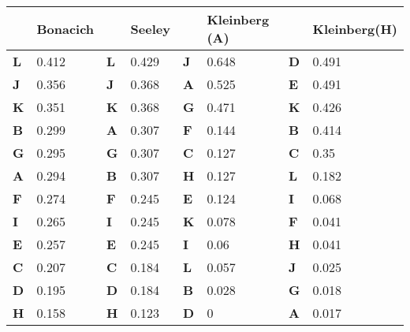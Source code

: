 \begin{table}[!h]
\centering
\begin{tabular}[t]{>{}ll>{}ll>{}ll>{}ll}
\toprule
 & Bonacich &  & Seeley &  & Kleinberg (A) &  & Kleinberg(H)\\
\midrule
\textbf{L} & 0.412 & \textbf{L} & 0.429 & \textbf{J} & 0.648 & \textbf{D} & 0.491\\
\textbf{J} & 0.356 & \textbf{J} & 0.368 & \textbf{A} & 0.525 & \textbf{E} & 0.491\\
\textbf{K} & 0.351 & \textbf{K} & 0.368 & \textbf{G} & 0.471 & \textbf{K} & 0.426\\
\textbf{B} & 0.299 & \textbf{A} & 0.307 & \textbf{F} & 0.144 & \textbf{B} & 0.414\\
\textbf{G} & 0.295 & \textbf{G} & 0.307 & \textbf{C} & 0.127 & \textbf{C} & 0.35\\
\textbf{A} & 0.294 & \textbf{B} & 0.307 & \textbf{H} & 0.127 & \textbf{L} & 0.182\\
\textbf{F} & 0.274 & \textbf{F} & 0.245 & \textbf{E} & 0.124 & \textbf{I} & 0.068\\
\textbf{I} & 0.265 & \textbf{I} & 0.245 & \textbf{K} & 0.078 & \textbf{F} & 0.041\\
\textbf{E} & 0.257 & \textbf{E} & 0.245 & \textbf{I} & 0.06 & \textbf{H} & 0.041\\
\textbf{C} & 0.207 & \textbf{C} & 0.184 & \textbf{L} & 0.057 & \textbf{J} & 0.025\\
\textbf{D} & 0.195 & \textbf{D} & 0.184 & \textbf{B} & 0.028 & \textbf{G} & 0.018\\
\textbf{H} & 0.158 & \textbf{H} & 0.123 & \textbf{D} & 0 & \textbf{A} & 0.017\\
\bottomrule
\end{tabular}
\end{table}
